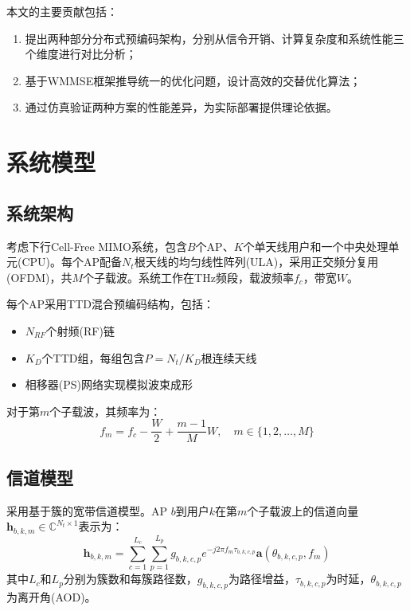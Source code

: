 \documentclass[10pt,twocolumn]{IEEEtran}
\newcommand{\Complex}{\mathbb{C}}
\newcommand{\vect}[1]{\mathbf{#1}}
\begin{document}
本文的主要贡献包括：
\begin{enumerate}
\item 提出两种部分分布式预编码架构，分别从信令开销、计算复杂度和系统性能三个维度进行对比分析；
\item 基于WMMSE框架推导统一的优化问题，设计高效的交替优化算法；
\item 通过仿真验证两种方案的性能差异，为实际部署提供理论依据。
\end{enumerate}

\section{系统模型}

\subsection{系统架构}

考虑下行Cell-Free MIMO系统，包含$B$个AP、$K$个单天线用户和一个中央处理单元(CPU)。每个AP配备$N_t$根天线的均匀线性阵列(ULA)，采用正交频分复用(OFDM)，共$M$个子载波。系统工作在THz频段，载波频率$f_c$，带宽$W$。

每个AP采用TTD混合预编码结构，包括：
\begin{itemize}
\item $N_{RF}$个射频(RF)链
\item $K_D$个TTD组，每组包含$P=N_t/K_D$根连续天线
\item 相移器(PS)网络实现模拟波束成形
\end{itemize}

对于第$m$个子载波，其频率为：
\begin{equation}
f_m = f_c - \frac{W}{2} + \frac{m-1}{M}W, \quad m \in \{1, 2, \ldots, M\}
\end{equation}

\subsection{信道模型}

采用基于簇的宽带信道模型。AP $b$到用户$k$在第$m$个子载波上的信道向量$\vect{h}_{b,k,m} \in \Complex^{N_t \times 1}$表示为：
\begin{equation}
\vect{h}_{b,k,m} = \sum_{c=1}^{L_c} \sum_{p=1}^{L_p} g_{b,k,c,p} e^{-j2\pi f_m \tau_{b,k,c,p}} \vect{a}(\theta_{b,k,c,p}, f_m)
\end{equation}
其中$L_c$和$L_p$分别为簇数和每簇路径数，$g_{b,k,c,p}$为路径增益，$\tau_{b,k,c,p}$为时延，$\theta_{b,k,c,p}$为离开角(AOD)。
\end{document}
